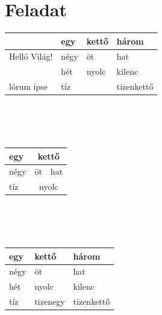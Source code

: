 \documentclass{article}
\begin{document}
	 \section{Feladat}
	 	\begin{tabular}{p{3em}||lll|}
	 		 & egy & kettő & három\\ \hline\hline
	 		Helló Világ! & négy & öt & hat\\ \cline{2-4}
	 		 & hét & nyolc & kilenc\\ \cline{2-2} \cline{4-4}
	 		 lórum ipse & tíz & & tizenkettő\\\hline 
	 	\end{tabular}
 		\\\\\\
 		\begin{tabular}{l|ll|}
 			egy & \multicolumn{2}{c|}{kettő}\\ \hline
 			\multirow{2}{2em}{négy} & \multicolumn{1}{c|}{öt} & hat\\ \cline{2-3}
 			& \multicolumn{2}{c|}{\multirow{2}{*}{nyolc}} \\ \cline{1-1}
 			tíz &  & \\\hline
 		\end{tabular}
 		\\\\\\
 		\begin{tabular}{l|l|l}
 			egy & kettő & három\\ \hline
 			négy & öt & hat\\ 
 			hét & nyolc & kilenc\\ 
 			tíz & tizenegy & tizenkettő\\
 		\end{tabular}
\end{document}
